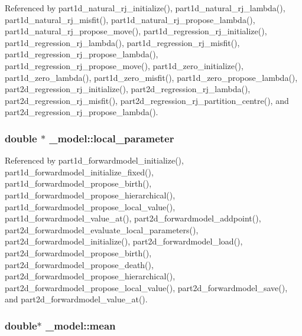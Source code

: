 Referenced by part1d\+\_\+natural\+\_\+rj\+\_\+initialize(), part1d\+\_\+natural\+\_\+rj\+\_\+lambda(), part1d\+\_\+natural\+\_\+rj\+\_\+misfit(), part1d\+\_\+natural\+\_\+rj\+\_\+propose\+\_\+lambda(), part1d\+\_\+natural\+\_\+rj\+\_\+propose\+\_\+move(), part1d\+\_\+regression\+\_\+rj\+\_\+initialize(), part1d\+\_\+regression\+\_\+rj\+\_\+lambda(), part1d\+\_\+regression\+\_\+rj\+\_\+misfit(), part1d\+\_\+regression\+\_\+rj\+\_\+propose\+\_\+lambda(), part1d\+\_\+regression\+\_\+rj\+\_\+propose\+\_\+move(), part1d\+\_\+zero\+\_\+initialize(), part1d\+\_\+zero\+\_\+lambda(), part1d\+\_\+zero\+\_\+misfit(), part1d\+\_\+zero\+\_\+propose\+\_\+lambda(), part2d\+\_\+regression\+\_\+rj\+\_\+initialize(), part2d\+\_\+regression\+\_\+rj\+\_\+lambda(), part2d\+\_\+regression\+\_\+rj\+\_\+misfit(), part2d\+\_\+regression\+\_\+rj\+\_\+partition\+\_\+centre(), and part2d\+\_\+regression\+\_\+rj\+\_\+propose\+\_\+lambda().

\subsubsection[{\texorpdfstring{local\+\_\+parameter}{local_parameter}}]{\setlength{\rightskip}{0pt plus 5cm}double $\ast$ \+\_\+model\+::local\+\_\+parameter}\hypertarget{struct__model_ae8e6a88a37a15bfc1a3465e5f2cb5b12}{}\label{struct__model_ae8e6a88a37a15bfc1a3465e5f2cb5b12}


Referenced by part1d\+\_\+forwardmodel\+\_\+initialize(), part1d\+\_\+forwardmodel\+\_\+initialize\+\_\+fixed(), part1d\+\_\+forwardmodel\+\_\+propose\+\_\+birth(), part1d\+\_\+forwardmodel\+\_\+propose\+\_\+hierarchical(), part1d\+\_\+forwardmodel\+\_\+propose\+\_\+local\+\_\+value(), part1d\+\_\+forwardmodel\+\_\+value\+\_\+at(), part2d\+\_\+forwardmodel\+\_\+addpoint(), part2d\+\_\+forwardmodel\+\_\+evaluate\+\_\+local\+\_\+parameters(), part2d\+\_\+forwardmodel\+\_\+initialize(), part2d\+\_\+forwardmodel\+\_\+load(), part2d\+\_\+forwardmodel\+\_\+propose\+\_\+birth(), part2d\+\_\+forwardmodel\+\_\+propose\+\_\+death(), part2d\+\_\+forwardmodel\+\_\+propose\+\_\+hierarchical(), part2d\+\_\+forwardmodel\+\_\+propose\+\_\+local\+\_\+value(), part2d\+\_\+forwardmodel\+\_\+save(), and part2d\+\_\+forwardmodel\+\_\+value\+\_\+at().

\subsubsection[{\texorpdfstring{mean}{mean}}]{\setlength{\rightskip}{0pt plus 5cm}double$\ast$ \+\_\+model\+::mean}\hypertarget{struct__model_aa3ad4728f4905d81455d065a2d249381}{}\label{struct__model_aa3ad4728f4905d81455d065a2d249381}


